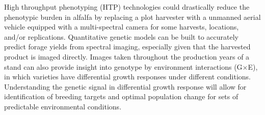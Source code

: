 \documentclass[12pt, letterpaper]{article}
\newcommand{\GxE}{G$\times$E}
\begin{document}












High throughput phenotyping (HTP) technologies could drastically reduce the phenotypic burden in alfalfa by replacing a plot harvester with a unmanned aerial vehicle equipped with a multi-spectral camera for some harvests, locations, and/or replications. Quantitative genetic models can be built to accurately predict forage yields from spectral imaging, especially given that the harvested product is imaged directly. Images taken throughout the production years of a stand can also provide insight into genotype by environment interactions (\GxE), in which varieties have differential growth responses under different conditions. Understanding the genetic signal in differential growth response will allow for identification of breeding targets and optimal population change for sets of predictable environmental conditions. 

\end{document}
